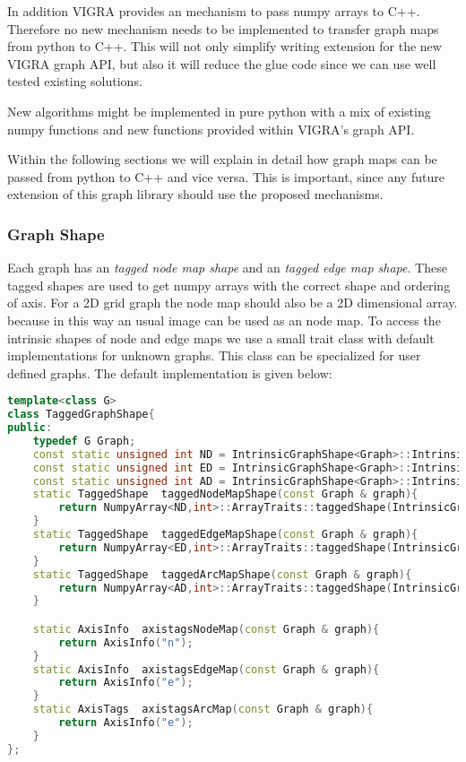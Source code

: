 In addition VIGRA provides an mechanism to pass numpy arrays to C++.
Therefore no new mechanism needs to be implemented to transfer graph
maps from python to C++.
This will not only simplify writing extension for the new VIGRA graph API,
but also it will reduce the glue code since we can use well tested existing
solutions.

New algorithms might be implemented in pure python with a mix of
existing numpy functions and new functions provided within VIGRA's graph API.


Within the following sections we will explain in detail
how graph maps can be passed from python to C++ and vice versa.
This is important, since any future extension of this graph library
should use the proposed mechanisms.


\subsubsection{Graph Shape}


Each graph has an \emph{tagged node map shape} 
and an \emph{tagged edge map shape}. 
These tagged shapes are used to get numpy arrays with 
the correct shape and ordering of axis.
For a 2D grid graph the node map should also be a 2D dimensional array.
because in this way an usual image can be used as an node map.
To access the  intrinsic shapes of node and edge maps 
we use a small trait class with default implementations
for unknown graphs.
This class can be specialized for user defined graphs.
The default implementation is given below:


\begin{lstlisting}[language=c++]
template<class G>
class TaggedGraphShape{
public:
    typedef G Graph;
    const static unsigned int ND = IntrinsicGraphShape<Graph>::IntrinsicNodeMapDimension;
    const static unsigned int ED = IntrinsicGraphShape<Graph>::IntrinsicEdgeMapDimension;
    const static unsigned int AD = IntrinsicGraphShape<Graph>::IntrinsicArcMapDimension;
    static TaggedShape  taggedNodeMapShape(const Graph & graph){
        return NumpyArray<ND,int>::ArrayTraits::taggedShape(IntrinsicGraphShape<Graph>::intrinsicNodeMapShape(graph),"n");
    }
    static TaggedShape  taggedEdgeMapShape(const Graph & graph){
        return NumpyArray<ED,int>::ArrayTraits::taggedShape(IntrinsicGraphShape<Graph>::intrinsicEdgeMapShape(graph),"e");
    }
    static TaggedShape  taggedArcMapShape(const Graph & graph){
        return NumpyArray<AD,int>::ArrayTraits::taggedShape(IntrinsicGraphShape<Graph>::intrinsicArcMapShape(graph),"e");
    }

    static AxisInfo  axistagsNodeMap(const Graph & graph){
        return AxisInfo("n");
    }
    static AxisInfo  axistagsEdgeMap(const Graph & graph){
        return AxisInfo("e");
    }
    static AxisTags  axistagsArcMap(const Graph & graph){
        return AxisInfo("e");
    }
};
\end{lstlisting}



